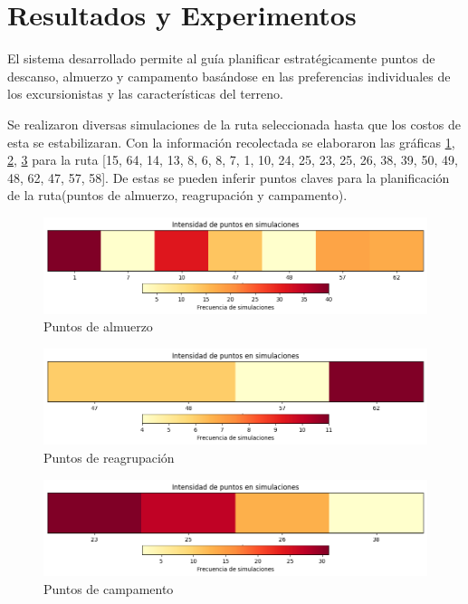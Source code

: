 \documentclass[10pt,twocolumn]{article}
\begin{document}
	
	\section{Resultados y Experimentos}

	El sistema desarrollado permite al guía planificar estratégicamente puntos de descanso, almuerzo y campamento basándose en las preferencias individuales de los excursionistas y las características del terreno. 
	
	Se realizaron diversas simulaciones de la ruta seleccionada hasta que los costos de esta se estabilizaran. Con la informaci\'on recolectada se elaboraron las gr\'aficas \ref{Puntos de almuerzo}, \ref{Puntos de reagrupacion}, \ref{Puntos de campamento} para la ruta [15, 64, 14, 13, 8, 6, 8, 7, 1, 10, 24, 25, 23, 25, 26, 38, 39, 50, 49, 48, 62, 47, 57, 58]. De estas se pueden inferir puntos claves para la planificaci\'on de la ruta(puntos de almuerzo, reagrupaci\'on y campamento).
	
	\begin{figure}
		\centering
		\includegraphics[width=1\linewidth]{launch_stats}
		\caption{Puntos de almuerzo}
		\label{Puntos de almuerzo}
	\end{figure}
	
	\begin{figure}
		\centering
		\includegraphics[width=1\linewidth]{reagroup_stats}
		\caption{Puntos de reagrupaci\'on}
		\label{Puntos de reagrupacion}
	\end{figure}

	\begin{figure}
		\centering
		\includegraphics[width=1\linewidth]{camp_stats}
		\caption{Puntos de campamento}
		\label{Puntos de campamento}
	\end{figure}
\end{document}
